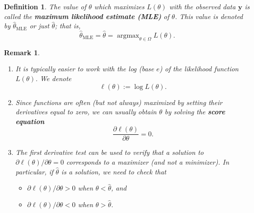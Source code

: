 \documentclass[10pt]{article}
\DeclareMathOperator{\MLE}{MLE}
\DeclareMathOperator{\argmax}{argmax}
\theoremstyle{newstyle}
\newtheorem{remark}[thm]{Remark}
\newtheorem{defn}[thm]{Definition}
\begin{document}
\begin{defn}
The value of $\theta$ which maximizes $L(\theta)$ with the observed data $\mathbf{y}$ 
is called the {\bf maximum likelihood estimate (MLE)} of $\theta$. This value is denoted by 
$\hat\theta_{\MLE}$ or just $\hat\theta$; that is, 
\[ \hat\theta_{\MLE} = \hat\theta = \argmax_{\theta\in\Omega} L(\theta). \]
\end{defn}

\begin{remark}~
\begin{enumerate}[(1)]
    \item It is typically easier to work with the log (base $e$) of the likelihood function 
    $L(\theta)$. We denote 
    \[ \ell(\theta) := \log L(\theta). \]
    \item Since functions are often (but not always) maximized by setting their derivatives 
    equal to zero, we can usually obtain $\theta$ by solving the {\bf score equation} 
    \[ \frac{\partial \ell(\theta)}{\partial\theta} = 0. \]
    \item The first derivative test can be used to verify that a solution to 
    $\partial\ell(\theta)/\partial\theta = 0$ corresponds to a maximizer (and not a minimizer). 
    In particular, if $\hat\theta$ is a solution, we need to check that 
    \begin{itemize}
        \item $\partial\ell(\theta)/\partial\theta > 0$ when $\theta < \hat\theta$, and 
        \item $\partial\ell(\theta)/\partial\theta < 0$ when $\theta > \hat\theta$. 
    \end{itemize}
\end{enumerate}
\end{remark}
\end{document}
